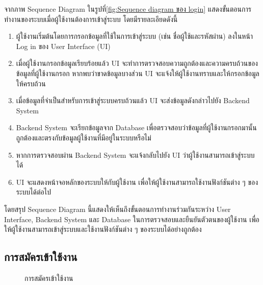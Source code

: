 \documentclass[14pt,oneside,openright,a4paper]{cpe-thai-project}
\begin{document}
จากภาพ Sequence Diagram ในรูปที่\ref{fig:Sequence diagram ของ login} แสดงขั้นตอนการทำงานของระบบเมื่อผู้ใช้งานต้องการเข้าสู่ระบบ โดยมีรายละเอียดดังนี้
  \begin{enumerate}
    \item ผู้ใช้งานเริ่มต้นโดยการกรอกข้อมูลที่ใช้ในการเข้าสู่ระบบ (เช่น ชื่อผู้ใช้และรหัสผ่าน) ลงในหน้า Log in ของ User Interface (UI)
    \item เมื่อผู้ใช้งานกรอกข้อมูลเรียบร้อยแล้ว UI จะทำการตรวจสอบความถูกต้องและความครบถ้วนของข้อมูลที่ผู้ใช้งานกรอก หากพบว่าขาดข้อมูลบางส่วน UI จะแจ้งให้ผู้ใช้งานทราบและให้กรอกข้อมูลให้ครบถ้วน
    \item เมื่อข้อมูลที่จำเป็นสำหรับการเข้าสู่ระบบครบถ้วนแล้ว UI จะส่งข้อมูลดังกล่าวไปยัง Backend System
    \item Backend System จะเรียกข้อมูลจาก Database เพื่อตรวจสอบว่าข้อมูลที่ผู้ใช้งานกรอกมานั้นถูกต้องและตรงกับข้อมูลผู้ใช้งานที่มีอยู่ในระบบหรือไม่
    \item หากการตรวจสอบผ่าน Backend System จะแจ้งกลับไปยัง UI ว่าผู้ใช้งานสามารถเข้าสู่ระบบได้
    \item UI จะแสดงหน้าจอหลักของระบบให้กับผู้ใช้งาน เพื่อให้ผู้ใช้งานสามารถใช้งานฟังก์ชันต่าง ๆ ของระบบได้ต่อไป
  \end{enumerate}
  โดยสรุป Sequence Diagram นี้แสดงให้เห็นถึงขั้นตอนการทำงานร่วมกันระหว่าง User Interface, Backend System และ Database ในการตรวจสอบและยืนยันตัวตนของผู้ใช้งาน เพื่อให้ผู้ใช้งานสามารถเข้าสู่ระบบและใช้งานฟังก์ชันต่าง ๆ ของระบบได้อย่างถูกต้อง

\newpage

\subsection{การสมัครเข้าใช้งาน}

  \begin{figure}[!h]\centering
    \setlength{\fboxrule}{0.5mm} %
    \setlength{\fboxsep}{0.5cm}
    \caption{\centering การสมัครเข้าใช้งาน}\label{fig:regis}
  \end{figure}
\end{document}
